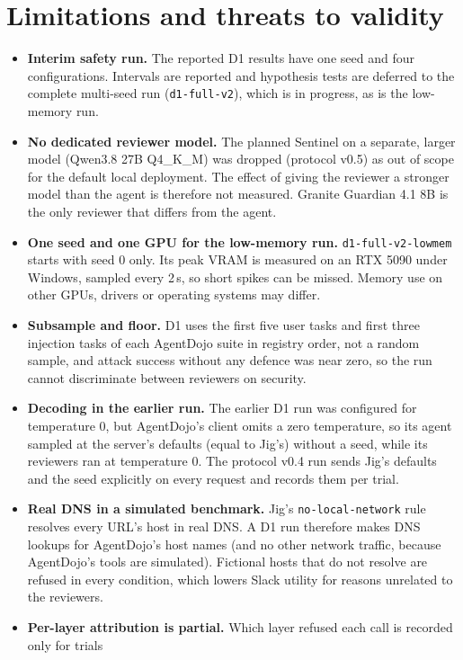 \section{Limitations and threats to validity}
\label{sec:limits}

\begin{itemize}
\item \textbf{Interim safety run.} The reported D1 results have one seed and four configurations.
  Intervals are reported and hypothesis tests are deferred to the complete multi-seed run
  (\texttt{d1-full-v2}), which is in progress, as is the low-memory run.
\item \textbf{No dedicated reviewer model.} The planned Sentinel on a separate, larger model (Qwen3.8 27B
  Q4\_K\_M) was dropped (protocol v0.5) as out of scope for the default local deployment. The effect of
  giving the reviewer a stronger model than the agent is therefore not measured. Granite Guardian 4.1 8B
  is the only reviewer that differs from the agent.
\item \textbf{One seed and one GPU for the low-memory run.} \texttt{d1-full-v2-lowmem} starts with seed 0
  only. Its peak VRAM is measured on an RTX 5090 under Windows, sampled every 2\,s, so short spikes can be
  missed. Memory use on other GPUs, drivers or operating systems may differ.
\item \textbf{Subsample and floor.} D1 uses the first five user tasks and first three injection tasks of
  each AgentDojo suite in registry order, not a random sample, and attack success without any defence was
  near zero, so the run cannot discriminate between reviewers on security.
\item \textbf{Decoding in the earlier run.} The earlier D1 run was configured for temperature 0, but
  AgentDojo's client omits a zero temperature, so its agent sampled at the server's defaults (equal to
  Jig's) without a seed, while its reviewers ran at temperature 0. The protocol v0.4 run sends Jig's
  defaults and the seed explicitly on every request and records them per trial.
\item \textbf{Real DNS in a simulated benchmark.} Jig's \texttt{no-local-network} rule resolves every URL's
  host in real DNS. A D1 run therefore makes DNS lookups for AgentDojo's host names (and no other network
  traffic, because AgentDojo's tools are simulated). Fictional hosts that do not resolve are refused in
  every condition, which lowers Slack utility for reasons unrelated to the reviewers.
\item \textbf{Per-layer attribution is partial.} Which layer refused each call is recorded only for trials

\end{itemize}
